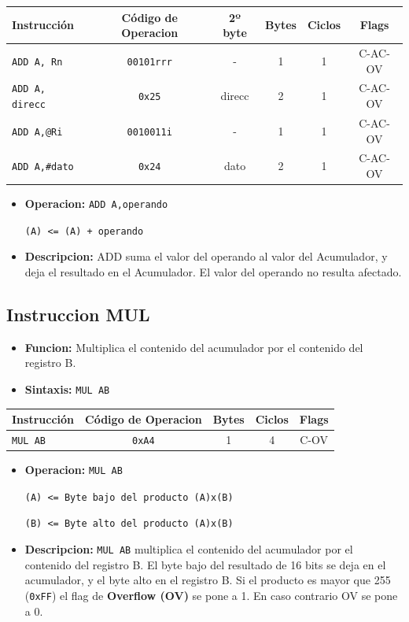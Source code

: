 \documentclass[doc, donotrepeattitle, biblatex, apacite]{apa6}
\begin{document}
\begin{center}
	\begin{tabular}{|l|c|c|c|c|c|}
		\hline
		Instrucción & Código de Operacion & 2º byte & Bytes & Ciclos & Flags
		\\ \hline
		\texttt{ADD A, Rn} & \texttt{00101rrr} & - & 1 & 1 & C-AC-OV
		\\
		\texttt{ADD A, direcc} & \texttt{0x25} & direcc & 2 & 1 & C-AC-OV
		\\
		\texttt{ADD A,@Ri} & \texttt{0010011i} & - & 1 & 1 & C-AC-OV
		\\
		\texttt{ADD A,\#dato} & \texttt{0x24} & dato & 2 & 1 & C-AC-OV
		\\ \hline
	\end{tabular}
\end{center}

\begin{itemize}
\item \textbf{Operacion:} \texttt{ADD A,operando}

\texttt{(A) <= (A) + operando}
\item \textbf{Descripcion:} ADD suma el valor del operando al valor del Acumulador, y deja el resultado en el Acumulador. El valor del operando no resulta afectado.
\end{itemize}

\newpage
\subsection{Instruccion MUL}
\begin{itemize}
\item \textbf{Funcion:} Multiplica el contenido del acumulador por el contenido del registro B.
\item \textbf{Sintaxis:} \texttt{MUL AB}
\end{itemize}

\begin{center}
	\begin{tabular}{|l|c|c|c|c|}
		\hline
		Instrucción & Código de Operacion & Bytes & Ciclos & Flags
		\\ \hline
		\texttt{MUL AB} & \texttt{0xA4} & 1 & 4 & C-OV
		\\ \hline
	\end{tabular}
\end{center}

\begin{itemize}
\item \textbf{Operacion:} \texttt{MUL AB}

\texttt{(A) <= Byte bajo del producto (A)x(B)}

\texttt{(B) <= Byte alto del producto (A)x(B)}

\item \textbf{Descripcion:} \texttt{MUL AB} multiplica el contenido del acumulador por el contenido del registro B. El byte bajo del resultado de 16 bits se deja en el acumulador, y el byte alto en el registro B. Si el producto es mayor que 255 (\texttt{0xFF}) el flag de \textbf{Overflow (OV)} se pone a 1. En caso contrario OV se pone a 0.
\end{itemize}
\end{document}
